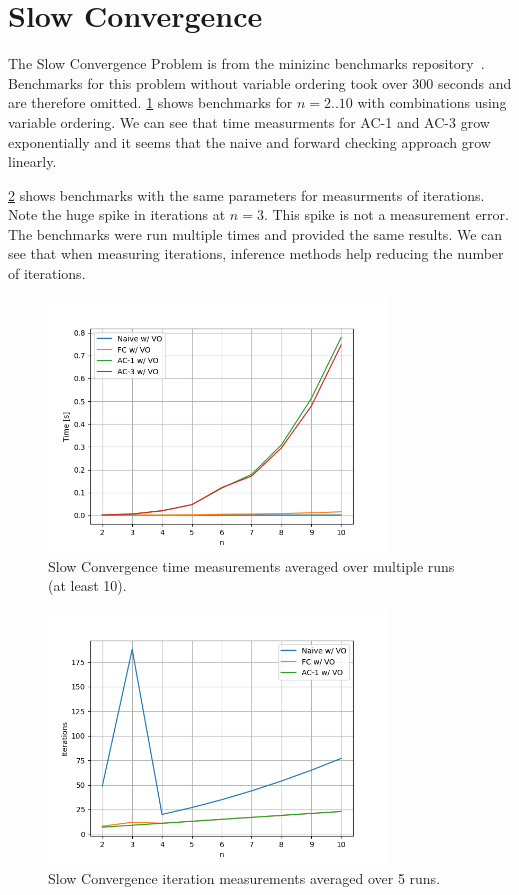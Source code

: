 \section{Slow Convergence}

The Slow Convergence Problem is from the minizinc benchmarks repository~\cite{minizinc_slow:2018}. Benchmarks for this problem without variable ordering took over 300 seconds and are therefore omitted. \cref{fig:slow:time-small} shows benchmarks for $n=2..10$ with combinations using variable ordering. We can see that time measurments for AC-1 and AC-3 grow exponentially and it seems that the naive and forward checking approach grow linearly.

\cref{fig:slow:iterations-small} shows benchmarks with the same parameters for measurments of iterations. Note the huge spike in iterations at $n = 3$. This spike is not a measurement error. The benchmarks were run multiple times and provided the same results. We can see that when measuring iterations, inference methods help reducing the number of iterations.

\begin{figure}[ht]
	\centering
	\includegraphics[width=0.8\textwidth]{./Problems/slow_convergence/plots/time_small.png}
	\caption{Slow Convergence time measurements averaged over multiple runs (at least 10).}
	\label{fig:slow:time-small}
\end{figure}

\begin{figure}[ht]
	\centering
	\includegraphics[width=0.8\textwidth]{./Problems/slow_convergence/plots/iterations_small.png}
	\caption{Slow Convergence iteration measurements averaged over 5 runs.}
	\label{fig:slow:iterations-small}
\end{figure}

